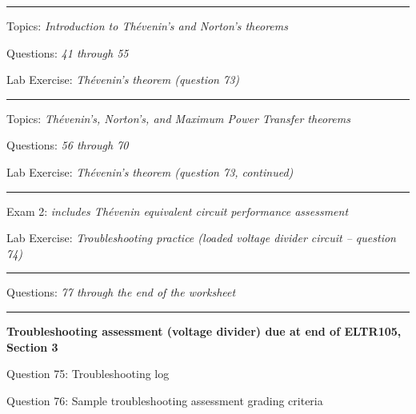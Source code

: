 


\vskip 10pt
\hrule \vskip 5pt
\noindent
{}

\hskip 10pt Topics: {\it Introduction to Th\'evenin's and Norton's theorems}
 
\hskip 10pt Questions: {\it 41 through 55}
 
\hskip 10pt Lab Exercise: {\it Th\'evenin's theorem (question 73)}
 


\vskip 10pt
\hrule \vskip 5pt
\noindent
{}

\hskip 10pt Topics: {\it Th\'evenin's, Norton's, and Maximum Power Transfer theorems}
 
\hskip 10pt Questions: {\it 56 through 70} 
 
\hskip 10pt Lab Exercise: {\it Th\'evenin's theorem (question 73, continued)}
 
\vskip 10pt
\hrule \vskip 5pt
\noindent
{}

\hskip 10pt Exam 2: {\it includes Th\'evenin equivalent circuit performance assessment}
 
\hskip 10pt Lab Exercise: {\it Troubleshooting practice (loaded voltage divider circuit -- question 74)}
 
\vskip 10pt
\hrule \vskip 5pt
\noindent
{}

\hskip 10pt Questions: {\it 77 through the end of the worksheet}
 
\vskip 10pt
\hrule \vskip 5pt
\noindent
{}

\hskip 10pt {\bf Troubleshooting assessment (voltage divider) due at end of ELTR105, Section 3}
 
\hskip 10pt Question 75: Troubleshooting log
 
\hskip 10pt Question 76: Sample troubleshooting assessment grading criteria
 
